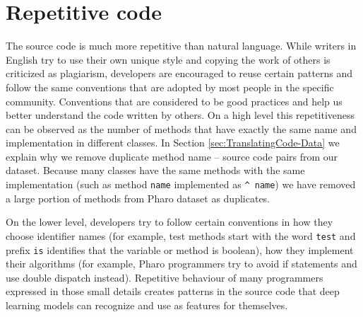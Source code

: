 
\section{Repetitive code}
\label{sec:Naturalness-Repetitive}

The source code is much more repetitive than natural language. While writers in English try to use their own unique style and copying the work of others is criticized as plagiarism, developers are encouraged to reuse certain patterns and follow the same conventions that are adopted by most people in the specific community. Conventions that are considered to be good practices and help us better understand the code written by others. On a high level this repetitiveness can be observed as the number of methods that have exactly the same name and implementation in different classes. In Section \ref{sec:TranslatingCode-Data} we explain why we remove duplicate method name -- source code pairs from our dataset. Because many classes have the same methods with the same implementation (such as method \texttt{name} implemented as \lstinline{^ name}) we have removed a large portion of methods from Pharo dataset as duplicates.

On the lower level, developers try to follow certain conventions in how they choose identifier names (for example, test methods start with the word \texttt{test} and prefix \texttt{is} identifies that the variable or method is boolean), how they implement their algorithms (for example, Pharo programmers try to avoid if statements and use double dispatch instead). Repetitive behaviour of many programmers expressed in those small details creates patterns in the source code that deep learning models can recognize and use as features for themselves.

